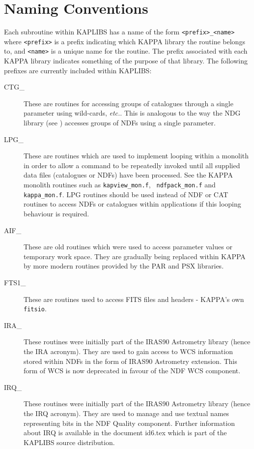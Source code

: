 \section{Naming Conventions}
Each subroutine within KAPLIBS has a name of the form {\tt <prefix>\_<name>}
where {\tt <prefix>} is a prefix indicating which KAPPA library the
routine belongs to, and {\tt <name>} is a unique name for the routine.
The prefix associated with each KAPPA library indicates something of the
purpose of that library. The following prefixes are currently included
within KAPLIBS:

\begin{description}

\item [CTG\_] These are routines for accessing groups of catalogues through
a single parameter using wild-cards, \emph{etc.}. This is analogous to
the way the NDG library (see ) accesses groups 
of NDFs using a single parameter.

\item [LPG\_] These are routines which are used to implement looping
within a monolith in order to allow a command to be repeatedly invoked
until all supplied data files (catalogues or NDFs) have been processed.
See the KAPPA monolith routines such as {\tt kapview\_mon.f}, {\tt
ndfpack\_mon.f} and {\tt kappa\_mon.f}. LPG routines should be used instead
of NDF or CAT routines to access NDFs or catalogues within applications
if this looping behaviour is required.

\item [AIF\_] These are old routines which were used to access parameter
values or temporary work space. They are gradually being replaced within
KAPPA by more modern routines provided by the PAR and PSX libraries.

\item [FTS1\_] These are routines used to access FITS files and headers - 
KAPPA's own {\tt fitsio}.

\item [IRA\_] These routines were initially part of the IRAS90 Astrometry
library (hence the IRA acronym). They are used to gain access to WCS
information stored within NDFs in the form of IRAS90 Astrometry extension.
This form of WCS is now deprecated in favour of the NDF WCS component.

\item [IRQ\_] These routines were initially part of the IRAS90 Astrometry
library (hence the IRQ acronym). They are used to manage and use textual
names representing bits in the NDF Quality component. Further information
about IRQ is available in the document id6.tex which is part of the
KAPLIBS source distribution.


\end{description}
